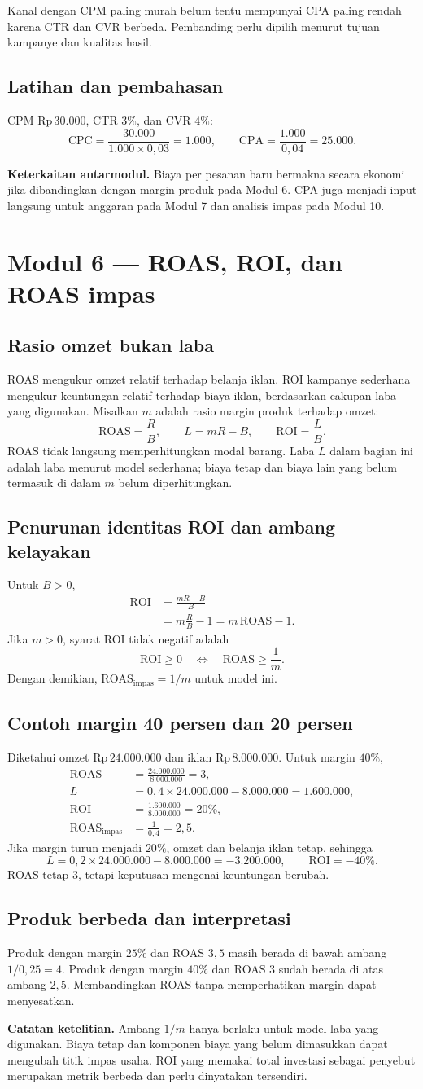 \documentclass[11pt,a4paper]{article}
\newcommand{\modul}[2]{\clearpage\section{Modul #1 --- #2}}
\newcommand{\bagian}[1]{\Needspace{5\baselineskip}\subsection{#1}}
\newcommand{\catatan}[1]{\par\textbf{Catatan ketelitian.} #1\par}
\newcommand{\jembatan}[1]{\par\textbf{Keterkaitan antarmodul.} #1\par}
\newcommand{\CPC}{\mathrm{CPC}}
\newcommand{\CPA}{\mathrm{CPA}}
\newcommand{\ROAS}{\mathrm{ROAS}}
\newcommand{\ROI}{\mathrm{ROI}}
\newcommand{\rp}[1]{\ensuremath{\mathrm{Rp}\,#1}}
\begin{document}
Kanal dengan CPM paling murah belum tentu mempunyai CPA paling rendah karena CTR dan CVR berbeda. Pembanding perlu dipilih menurut tujuan kampanye dan kualitas hasil.

\bagian{Latihan dan pembahasan}
CPM \rp{30.000}, CTR \(3\%\), dan CVR \(4\%\):
\[
\CPC=\frac{30.000}{1.000\times0{,}03}=1.000,\qquad
\CPA=\frac{1.000}{0{,}04}=25.000.
\]
\jembatan{Biaya per pesanan baru bermakna secara ekonomi jika dibandingkan dengan margin produk pada Modul 6. CPA juga menjadi input langsung untuk anggaran pada Modul 7 dan analisis impas pada Modul 10.}

\modul{6}{ROAS, ROI, dan ROAS impas}
\bagian{Rasio omzet bukan laba}
ROAS mengukur omzet relatif terhadap belanja iklan. ROI kampanye sederhana mengukur keuntungan relatif terhadap biaya iklan, berdasarkan cakupan laba yang digunakan. Misalkan \(m\) adalah rasio margin produk terhadap omzet:
\[
\ROAS=\frac{R}{B},\qquad L=mR-B,\qquad \ROI=\frac{L}{B}.
\]
ROAS tidak langsung memperhitungkan modal barang. Laba \(L\) dalam bagian ini adalah laba menurut model sederhana; biaya tetap dan biaya lain yang belum termasuk di dalam \(m\) belum diperhitungkan.

\bagian{Penurunan identitas ROI dan ambang kelayakan}
Untuk \(B>0\),
\[
\begin{aligned}
\ROI&=\frac{mR-B}{B}\\
&=m\frac{R}{B}-1=m\,\ROAS-1.
\end{aligned}
\]
Jika \(m>0\), syarat ROI tidak negatif adalah
\[
\ROI\ge0\quad\Longleftrightarrow\quad
\ROAS\ge\frac{1}{m}.
\]
Dengan demikian, \(\ROAS_{\text{impas}}=1/m\) untuk model ini.

\bagian{Contoh margin 40 persen dan 20 persen}
Diketahui omzet \rp{24.000.000} dan iklan \rp{8.000.000}. Untuk margin \(40\%\),
\[
\begin{aligned}
\ROAS&=\frac{24.000.000}{8.000.000}=3,\\
L&=0{,}4\times24.000.000-8.000.000=1.600.000,\\
\ROI&=\frac{1.600.000}{8.000.000}=20\%,\\
\ROAS_{\text{impas}}&=\frac{1}{0{,}4}=2{,}5.
\end{aligned}
\]
Jika margin turun menjadi \(20\%\), omzet dan belanja iklan tetap, sehingga
\[
L=0{,}2\times24.000.000-8.000.000=-3.200.000,
\qquad \ROI=-40\%.
\]
ROAS tetap 3, tetapi keputusan mengenai keuntungan berubah.

\bagian{Produk berbeda dan interpretasi}
Produk dengan margin \(25\%\) dan ROAS \(3{,}5\) masih berada di bawah ambang \(1/0{,}25=4\). Produk dengan margin \(40\%\) dan ROAS 3 sudah berada di atas ambang \(2{,}5\). Membandingkan ROAS tanpa memperhatikan margin dapat menyesatkan.
\catatan{Ambang \(1/m\) hanya berlaku untuk model laba yang digunakan. Biaya tetap dan komponen biaya yang belum dimasukkan dapat mengubah titik impas usaha. ROI yang memakai total investasi sebagai penyebut merupakan metrik berbeda dan perlu dinyatakan tersendiri.}
\end{document}

